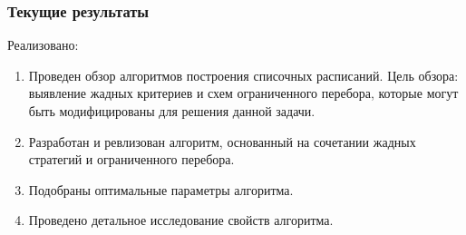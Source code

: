 \begin{frame}
    \frametitle{Текущие результаты}
    Реализовано:
    \begin{enumerate}
        \item Проведен обзор алгоритмов построения списочных расписаний. Цель обзора: выявление жадных критериев и схем ограниченного перебора, которые могут быть модифицированы для решения данной задачи.
        \item Разработан и ревлизован алгоритм, основанный на сочетании жадных стратегий и ограниченного перебора.
        \item Подобраны оптимальные параметры алгоритма.
        \item Проведено детальное исследование свойств алгоритма. 
    \end{enumerate}
\end{frame}